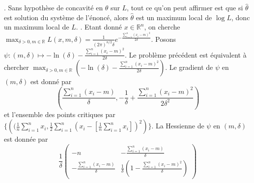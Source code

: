 \documentclass{report}
\begin{document}
\subsection{} \noindent{}\\ 
\\ 
\\
. Sans hypothèse de concavité en $\theta$ sur $L$, tout ce qu'on peut affirmer est que si $\hat \theta$ est solution du système de l'énoncé, alors $\hat \theta$ est un maximum local de $\log L$, donc un maximum local de $L$.\newline
{}. Etant donné $x\in \mathbb R^n$, on cherche $\displaystyle \max_{\delta >0, m \in \mathbb R} L(x,m,\delta)=\frac{1}{(2\pi)^{n/2}\delta}e^{-\frac{\sum_{i=1}^n (x_i-m)^2}{2\delta}}$.\newline
Posons $\psi:(m,\delta)\mapsto -\ln(\delta) - \frac{\sum_{i=1}^n(x_i-m)^2}{2\delta}$. Le problème précédent est équivalent à chercher $\max_{\delta >0, m \in \mathbb R} \left(-\ln(\delta) - \frac{\sum_{i=1}^n(x_i-m)^2}{2\delta}\right)$.\newline
Le gradient de $\psi$ en $(m,\delta)$ est donné par $$\left(\frac{\sum_{i=1}^n (x_i-m)}{\delta}, -\frac{1}{\delta} + \frac{\sum_{i=1}^n (x_i-m)^2}{2\delta^2}  \right)$$ et l'ensemble des points critiques par $\{\left((\frac{1}{n}\sum_{i=1}^n x_i, \frac{1}{2}\sum_{i=1}^n \left(x_i - \left[\frac{1}{n}\sum_{i=1}^n x_i \right]\right)^2\right)\}$. \newline
La Hessienne de $\psi$ en $(m,\delta)$ est donnée par $$\frac{1}{\delta}\begin{pmatrix}
-n & -\frac{\sum_{i=1}^n (x_i-m)}{\delta} \\
-\frac{\sum_{i=1}^n (x_i-m)}{\delta} & \frac{1}{\delta} \left(1-\frac{\sum_{i=1}^n (x_i-m)^2}{\delta} \right)
\end{pmatrix}$$
\end{document}
